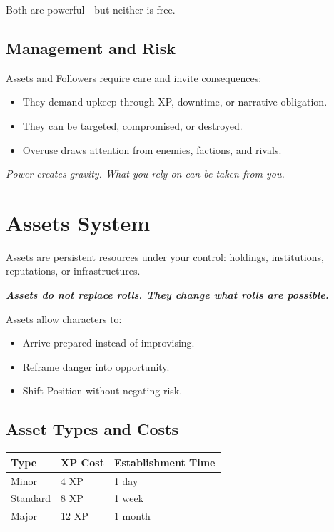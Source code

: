 Both are powerful---but neither is free.

\subsection*{Management and Risk}
Assets and Followers require care and invite consequences:
\begin{itemize}
\item They demand upkeep through XP, downtime, or narrative obligation.
\item They can be targeted, compromised, or destroyed.
\item Overuse draws attention from enemies, factions, and rivals.
\end{itemize}

\emph{Power creates gravity. What you rely on can be taken from you.}

\section{Assets System}
\label{sec:assets-system}

Assets are persistent resources under your control: holdings, institutions, reputations, or infrastructures.

\textit{\textbf{Assets do not replace rolls. They change what rolls are possible.}}

Assets allow characters to:
\begin{itemize}
\item Arrive prepared instead of improvising.
\item Reframe danger into opportunity.
\item Shift Position without negating risk.
\end{itemize}

\subsection*{Asset Types and Costs}
\label{sec:asset-types-costs}
\begin{center}
\begin{tabular}{lll}
\toprule
\textbf{Type} & \textbf{XP Cost} & \textbf{Establishment Time} \\
\midrule
Minor    & 4 XP  & 1 day \\
Standard & 8 XP  & 1 week \\
Major    & 12 XP & 1 month \\
\bottomrule
\end{tabular}
\end{center}

